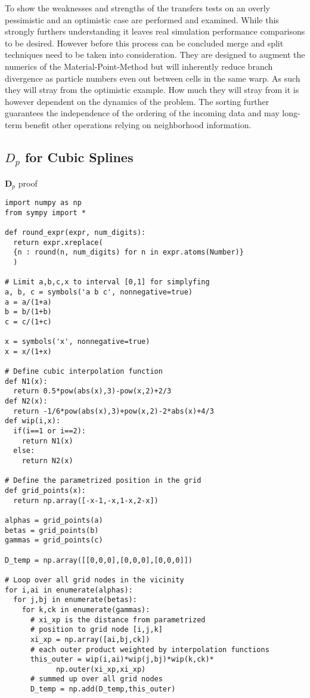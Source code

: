 \documentclass[m,times]{cgMA}
\newenvironment{code}{\captionsetup{type=algorithm}}{}
\begin{document}
To show the weaknesses and strengths of the transfers tests on an overly pessimistic and an optimistic case are performed and examined. While this strongly furthers understanding it leaves real simulation performance comparisons to be desired. However before this process can be concluded merge and split techniques need to be taken into consideration. They are designed to augment the numerics of the Material-Point-Method but will inherently reduce branch divergence as particle numbers even out between cells in the same warp. As such they will stray from the optimistic example. How much they will stray from it is however dependent on the dynamics of the problem. The sorting further guarantees the independence of the ordering of the incoming data and may long-term benefit other operations relying on neighborhood information.
\clearpage
\begin{appendices}
\section{$D_p$ for Cubic Splines}\label{app:dp_proof}
  \begin{code}
\caption{$\boldsymbol{D}_p$ proof}
  \begin{verbatim}
import numpy as np
from sympy import *

def round_expr(expr, num_digits):
  return expr.xreplace(
  {n : round(n, num_digits) for n in expr.atoms(Number)}
  )

# Limit a,b,c,x to interval [0,1] for simplyfing
a, b, c = symbols('a b c', nonnegative=true)
a = a/(1+a)
b = b/(1+b)
c = c/(1+c)

x = symbols('x', nonnegative=true)
x = x/(1+x)

# Define cubic interpolation function
def N1(x):
  return 0.5*pow(abs(x),3)-pow(x,2)+2/3
def N2(x):
  return -1/6*pow(abs(x),3)+pow(x,2)-2*abs(x)+4/3
def wip(i,x):
  if(i==1 or i==2):
    return N1(x)
  else:
    return N2(x)

# Define the parametrized position in the grid
def grid_points(x):
  return np.array([-x-1,-x,1-x,2-x])

alphas = grid_points(a)
betas = grid_points(b)
gammas = grid_points(c)

D_temp = np.array([[0,0,0],[0,0,0],[0,0,0]])

# Loop over all grid nodes in the vicinity
for i,ai in enumerate(alphas):
  for j,bj in enumerate(betas):
    for k,ck in enumerate(gammas):
      # xi_xp is the distance from parametrized
      # position to grid node [i,j,k]
      xi_xp = np.array([ai,bj,ck])
      # each outer product weighted by interpolation functions
      this_outer = wip(i,ai)*wip(j,bj)*wip(k,ck)*
		    np.outer(xi_xp,xi_xp)
      # summed up over all grid nodes
      D_temp = np.add(D_temp,this_outer)


\end{verbatim}
\end{code}
\end{appendices}
\end{document}
